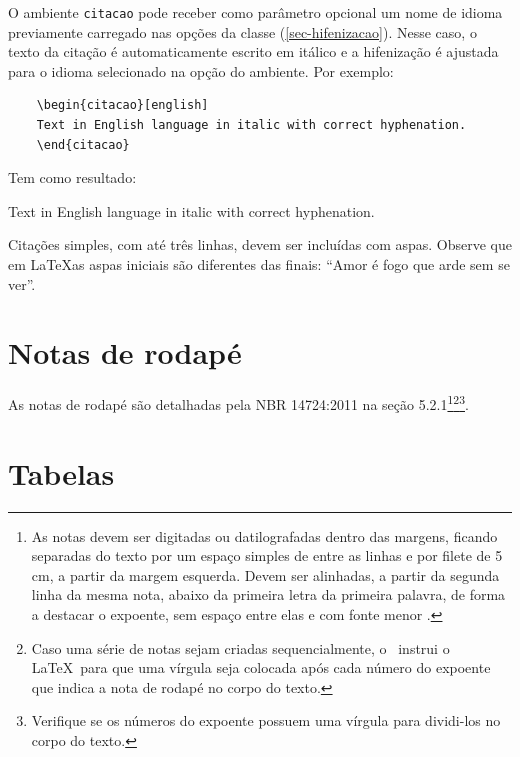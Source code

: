     O ambiente \texttt{citacao} pode receber como parâmetro opcional um nome de
    idioma previamente carregado nas opções da classe (\autoref{sec-hifenizacao}). Nesse
    caso, o texto da citação é automaticamente escrito em itálico e a hifenização é
    ajustada para o idioma selecionado na opção do ambiente. Por exemplo:

    \begin{verbatim}
    \begin{citacao}[english]
    Text in English language in italic with correct hyphenation.
    \end{citacao}
    \end{verbatim}

    Tem como resultado:

    \begin{citacao}[english]
    Text in English language in italic with correct hyphenation.
    \end{citacao}

    Citações simples, com até três linhas, devem ser
    incluídas com aspas. Observe que em \LaTeX as aspas iniciais são diferentes das
    finais: ``Amor é fogo que arde sem se ver''.

    \section{Notas de rodapé}

    As notas de rodapé são detalhadas pela NBR 14724:2011 na seção 5.2.1\footnote{As
    notas devem ser digitadas ou datilografadas dentro das margens, ficando
    separadas do texto por um espaço simples de entre as linhas e por filete de 5
    cm, a partir da margem esquerda. Devem ser alinhadas, a partir da segunda linha
    da mesma nota, abaixo da primeira letra da primeira palavra, de forma a destacar
    o expoente, sem espaço entre elas e com fonte menor
    .}\footnote{Caso uma série de notas sejam
    criadas sequencialmente, o \abnTeX\ instrui o \LaTeX\ para que uma vírgula seja
    colocada após cada número do expoente que indica a nota de rodapé no corpo do
    texto.}\footnote{Verifique se os números do expoente possuem uma vírgula para
    dividi-los no corpo do texto.}.


    \section{Tabelas}

